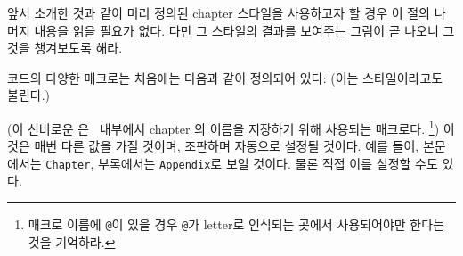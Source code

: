 앞서 소개한 것과 같이 미리 정의된 chapter 스타일을 사용하고자 할 경우
이 절의 나머지 내용을 읽을 필요가 없다.
다만 그 스타일의 결과를 보여주는 그림이 곧 나오니 그것을 챙겨보도록 해라.

 코드의 다양한 매크로는 처음에는 다음과 같이 정의되어 있다:
(이는  스타일이라고도 불린다.)

\begin{lcode}
\newcommand{\chapterheadstart}{\vspace*{\beforechapskip}}
\newcommand{\printchaptername}{\chapnamefont \@chapapp}
\newcommand{\chapternamenum}{\space}
\newcommand{\printchapternum}{\chapnumfont \thechapter}
\newcommand{\afterchapternum}{\par\nobreak\vskip \midchapskip}
\newcommand{\printchapternonum}{}
\newcommand{\printchaptertitle}[1]{\chaptitlefont #1}
\newcommand{\afterchaptertitle}{\par\nobreak\vskip \afterchapskip}
\newcommand{\chapnamefont}{\normalfont\huge\bfseries}
\newcommand{\chapnumfont}{\normalfont\huge\bfseries}
\newcommand{\chaptitlefont}{\normalfont\Huge\bfseries}
\setlength{\beforechapskip}{50pt}
\setlength{\midchapskip}{20pt}
\setlength{\afterchapskip}{40pt}
\end{lcode}

(이 신비로운 \cmd{\@chapapp}은 \ltx\ 내부에서 chapter 의 이름을 저장하기 위해
사용되는 매크로다. \footnote{
매크로 이름에 \texttt{@}이 있을 경우 \texttt{@}가 letter로 인식되는 곳에서
사용되어야만 한다는 것을 기억하라.
})
이것은 매번 다른 값을 가질 것이며, 조판하며 자동으로 설정될 것이다.
예를 들어, 본문에서는 \texttt{Chapter}, 부록에서는 
\texttt{Appendix}로 보일 것이다.
물론 직접 이를 설정할 수도 있다.



